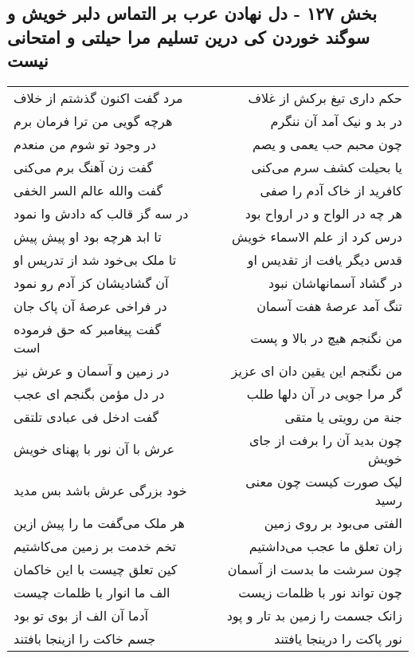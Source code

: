 \begin{center}
\section*{بخش ۱۲۷ - دل نهادن عرب بر التماس دلبر خویش و سوگند خوردن کی درین تسلیم مرا حیلتی و امتحانی نیست}
\label{sec:sh127}
\begin{longtable}{l p{0.5cm} r}
مرد گفت اکنون گذشتم از خلاف
&&
حکم داری تیغ برکش از غلاف
\\
هرچه گویی من ترا فرمان برم
&&
در بد و نیک آمد آن ننگرم
\\
در وجود تو شوم من منعدم
&&
چون محبم حب یعمی و یصم
\\
گفت زن آهنگ برم می‌کنی
&&
یا بحیلت کشف سرم می‌کنی
\\
گفت والله عالم السر الخفی
&&
کافرید از خاک آدم را صفی
\\
در سه گز قالب که دادش وا نمود
&&
هر چه در الواح و در ارواح بود
\\
تا ابد هرچه بود او پیش پیش
&&
درس کرد از علم الاسماء خویش
\\
تا ملک بی‌خود شد از تدریس او
&&
قدس دیگر یافت از تقدیس او
\\
آن گشادیشان کز آدم رو نمود
&&
در گشاد آسمانهاشان نبود
\\
در فراخی عرصهٔ آن پاک جان
&&
تنگ آمد عرصهٔ هفت آسمان
\\
گفت پیغامبر که حق فرموده است
&&
من نگنجم هیچ در بالا و پست
\\
در زمین و آسمان و عرش نیز
&&
من نگنجم این یقین دان ای عزیز
\\
در دل مؤمن بگنجم ای عجب
&&
گر مرا جویی در آن دلها طلب
\\
گفت ادخل فی عبادی تلتقی
&&
جنة من رویتی یا متقی
\\
عرش با آن نور با پهنای خویش
&&
چون بدید آن را برفت از جای خویش
\\
خود بزرگی عرش باشد بس مدید
&&
لیک صورت کیست چون معنی رسید
\\
هر ملک می‌گفت ما را پیش ازین
&&
الفتی می‌بود بر روی زمین
\\
تخم خدمت بر زمین می‌کاشتیم
&&
زان تعلق ما عجب می‌داشتیم
\\
کین تعلق چیست با این خاکمان
&&
چون سرشت ما بدست از آسمان
\\
الف ما انوار با ظلمات چیست
&&
چون تواند نور با ظلمات زیست
\\
آدما آن الف از بوی تو بود
&&
زانک جسمت را زمین بد تار و پود
\\
جسم خاکت را ازینجا بافتند
&&
نور پاکت را درینجا یافتند

\end{longtable}
\end{center}
